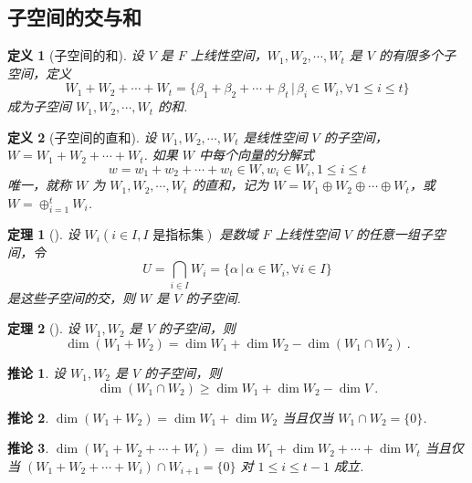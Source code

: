 \documentclass[zihao=-4,UTF8,linespread=1.8,nothm]{aytony_base}
\newtheorem{theorem}{\indent 定理}[subsection]
\newtheorem*{corollary}{\indent 推论}
\newtheorem{definition}{\indent 定义}[subsection]
\begin{document}
\subsection{子空间的交与和}

\begin{definition}[子空间的和]
    设 $V$ 是 $F$ 上线性空间，$W_1, W_2, \cdots, W_t$ 是 $V$ 的有限多个子空间，定义 $$
        W_1 + W_2 + \cdots + W_t = \{\beta_1 + \beta_2 + \cdots + \beta_t\,|\,\beta_i \in W_i, \forall  1 \leqslant i \leqslant t\}
    $$ 成为子空间 $W_1, W_2, \cdots, W_t$ 的和.
\end{definition}

\begin{definition}[子空间的直和]
    设 $W_1, W_2, \cdots, W_t$ 是线性空间 $V$ 的子空间，$W = W_1 + W_2 + \cdots + W_t$. 如果 $W$ 中每个向量的分解式 $$
        w = w_1 + w_2 + \cdots + w_t \in W, w_i \in W_i, 1 \leqslant i \leqslant t
    $$ 唯一，就称 $W$ 为 $W_1, W_2, \cdots, W_t$ 的直和，记为 $W = W_1 \oplus W_2 \oplus \cdots \oplus W_t$，或 $W = \oplus_{i=1}^tW_i$.
\end{definition}

\begin{theorem}[]
    设 $W_i(i \in I, \text{$I$ 是指标集})$ 是数域 $F$ 上线性空间 $V$ 的任意一组子空间，令 $$
        U = \bigcap_{i \in I}W_i = \{\alpha\,|\, \alpha \in W_i, \forall i \in I\}
    $$ 是这些子空间的交，则 $W$ 是 $V$ 的子空间.
\end{theorem}

\begin{theorem}[]
    设 $W_1, W_2$ 是 $V$ 的子空间，则 $$
        \dim(W_1 + W_2) = \dim W_1 + \dim W_2 - \dim(W_1 \cap W_2)\ .
    $$
\end{theorem}

\begin{corollary}
    设 $W_1, W_2$ 是 $V$ 的子空间，则 $$
        \dim(W_1 \cap W_2) \geqslant \dim W_1 + \dim W_2 - \dim V\ .
    $$
\end{corollary}

\begin{corollary}
    $\dim (W_1 + W_2) = \dim W_1 + \dim W_2$ 当且仅当 $W_1 \cap W_2 = \{0\}$.
\end{corollary}

\begin{corollary}
    $\dim(W_1 + W_2 + \cdots + W_t) = \dim W_1 + \dim W_2 + \cdots + \dim W_t$ 当且仅当 $(W_1 + W_2 + \cdots + W_i)\cap W_{i+1} = \{0\}$ 对 $1 \leqslant i \leqslant t-1$ 成立.
\end{corollary}
\end{document}
